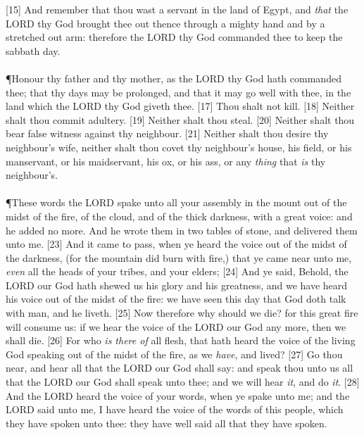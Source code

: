 [15] \textcolor[rgb]{0.00,0.00,1.00}{And remember that thou wast a servant in the land of Egypt, and \emph{that} the LORD thy God brought thee out thence through a mighty hand and by a stretched out arm: therefore the LORD thy God commanded thee to keep the sabbath day.}\\
\\
\P \textcolor[rgb]{0.00,0.00,1.00}{Honour thy father and thy mother, as the LORD thy God hath commanded thee; that thy days may be prolonged, and that it may go well with thee, in the land which the LORD thy God giveth thee.}
[17] \textcolor[rgb]{0.00,0.00,1.00}{Thou shalt not kill.}
[18] \textcolor[rgb]{0.00,0.00,1.00}{Neither shalt thou commit adultery.}
[19] \textcolor[rgb]{0.00,0.00,1.00}{Neither shalt thou steal.}
[20] \textcolor[rgb]{0.00,0.00,1.00}{Neither shalt thou bear false witness against thy neighbour.}
[21] \textcolor[rgb]{0.00,0.00,1.00}{Neither shalt thou desire thy neighbour's wife, neither shalt thou covet thy neighbour's house, his field, or his manservant, or his maidservant, his ox, or his ass, or any \emph{thing} that \emph{is} thy neighbour's.}\\
\\
\P \textcolor[rgb]{0.00,0.00,1.00}{These words the LORD spake unto all your assembly in the mount out of the midst of the fire, of the cloud, and of the thick darkness, with a great voice: and he added no more. And he wrote them in two tables of stone, and delivered them unto me.}
[23] \textcolor[rgb]{0.00,0.00,1.00}{And it came to pass, when ye heard the voice out of the midst of the darkness, (for the mountain did burn with fire,) that ye came near unto me, \emph{even} all the heads of your tribes, and your elders;}
[24] \textcolor[rgb]{0.00,0.00,1.00}{And ye said, Behold, the LORD our God hath shewed us his glory and his greatness, and we have heard his voice out of the midst of the fire: we have seen this day that God doth talk with man, and he liveth.}
[25] \textcolor[rgb]{0.00,0.00,1.00}{Now therefore why should we die? for this great fire will consume us: if we hear the voice of the LORD our God any more, then we shall die.}
[26] \textcolor[rgb]{0.00,0.00,1.00}{For who \emph{is there of} all flesh, that hath heard the voice of the living God speaking out of the midst of the fire, as we \emph{have}, and lived?}
[27] \textcolor[rgb]{0.00,0.00,1.00}{Go thou near, and hear all that the LORD our God shall say: and speak thou unto us all that the LORD our God shall speak unto thee; and we will hear \emph{it}, and do \emph{it}.}
[28] \textcolor[rgb]{0.00,0.00,1.00}{And the LORD heard the voice of your words, when ye spake unto me; and the LORD said unto me, I have heard the voice of the words of this people, which they have spoken unto thee: they have well said all that they have spoken.}
